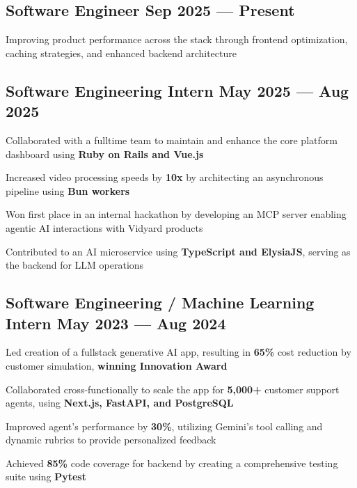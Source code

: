 \subsection{{Software Engineer \hfill Sep 2025 --- Present}}
\begin{zitemize}
    \item Improving product performance across the stack through frontend optimization, caching strategies, and enhanced backend architecture
\end{zitemize}


\subsection{{Software Engineering Intern \hfill May 2025 --- Aug 2025}}
\begin{zitemize}
    \item Collaborated with a fulltime team to maintain and enhance the core platform dashboard using \textbf{Ruby on Rails and Vue.js}  
    \item Increased video processing speeds by \textbf{10x} by architecting an asynchronous pipeline using \textbf{Bun workers}
    \item Won first place in an internal hackathon by developing an MCP server enabling agentic AI interactions with Vidyard products
    \item Contributed to an AI microservice using \textbf{TypeScript and ElysiaJS}, serving as the backend for LLM operations
    
\end{zitemize}


\subsection{{Software Engineering / Machine Learning Intern \hfill May 2023 --- Aug 2024}}
\begin{zitemize}
    \item Led creation of a fullstack generative AI app, resulting in \textbf{65\%} cost reduction by customer simulation, \textbf{winning Innovation Award}
    \item Collaborated cross-functionally to scale the app for \textbf{5,000+} customer support agents, using \textbf{Next.js, FastAPI, and PostgreSQL}
    \item Improved agent's performance by \textbf{30\%}, utilizing Gemini's tool calling and dynamic rubrics to provide personalized feedback
    \item Achieved \textbf{85\%} code coverage for backend by creating a comprehensive testing suite using \textbf{Pytest}
\end{zitemize}

